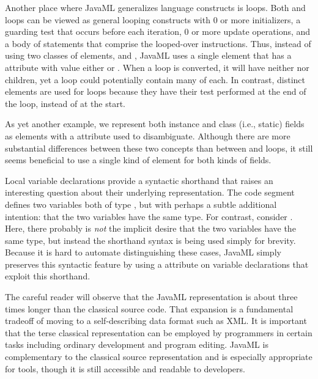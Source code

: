 \documentclass{article}
\begin{document}
\begin{multicols}{2}
Another place where JavaML generalizes language constructs is loops.
Both  and  loops can be viewed as general
looping constructs with 0 or more initializers, a guarding test that
occurs before each iteration, 0 or more update operations, and a body of
statements that comprise the looped-over instructions.  Thus, instead of
using two classes of elements,  and
, JavaML uses a single  element that
has a  attribute with value either  or
.  When a  loop is converted, it will
have neither  nor  children, yet
a  loop could potentially contain many of each.  In
contrast, distinct  elements are used for
 loops because they have their test performed at the end of
the loop, instead of at the start.

      
As yet another example, we represent both instance and class (i.e.,
static) fields as  elements with a 
attribute used to disambiguate.  Although there are more substantial
differences between these two concepts than between 
and  loops, it still seems beneficial to use a single
kind of element for both kinds of fields.

Local variable declarations provide a syntactic shorthand that raises an
interesting question about their underlying representation.  The code
segment  defines two variables both of type
, but with perhaps a subtle additional intention: that the
two variables have the same type.  For contrast, consider .  Here, there probably is \emph{not} the implicit desire
that the two variables have the same type, but instead the shorthand
syntax is being used simply for brevity.  Because it is hard to automate
distinguishing these cases, JavaML simply preserves this syntactic
feature by using a  attribute on variable
declarations that exploit this shorthand.

The careful reader will observe that the JavaML representation is about
three times longer than the classical source code.  That expansion is a
fundamental tradeoff of moving to a self-describing data format such as
XML.  It is important that the terse classical representation can be
employed by programmers in certain tasks including ordinary development
and program editing.  JavaML is complementary to the classical source
representation and is especially appropriate for tools, though it is
still accessible and readable to developers.


\end{multicols}
\end{document}
